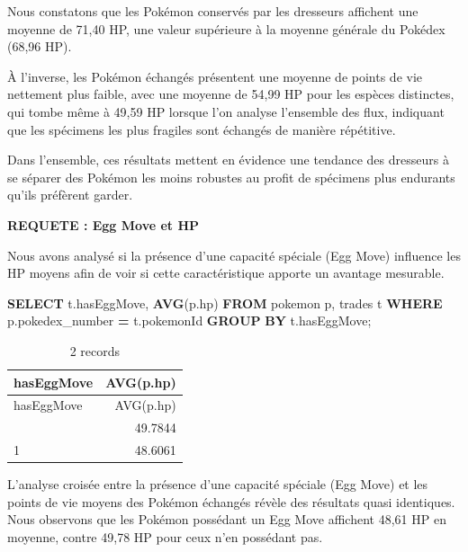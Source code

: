 \documentclass[mstat,12pt]{unswthesis}
\newenvironment{Shaded}{\begin{snugshade}}{\end{snugshade}}
\newcommand{\FunctionTok}[1]{\textcolor[rgb]{0.13,0.29,0.53}{\textbf{#1}}}
\newcommand{\KeywordTok}[1]{\textcolor[rgb]{0.13,0.29,0.53}{\textbf{#1}}}
\newcommand{\NormalTok}[1]{#1}
\newcommand{\OperatorTok}[1]{\textcolor[rgb]{0.81,0.36,0.00}{\textbf{#1}}}
\begin{document}
Nous constatons que les Pokémon conservés par les dresseurs affichent
une moyenne de 71,40 HP, une valeur supérieure à la moyenne générale du
Pokédex (68,96 HP).

À l'inverse, les Pokémon échangés présentent une moyenne de points de
vie nettement plus faible, avec une moyenne de 54,99 HP pour les espèces
distinctes, qui tombe même à 49,59 HP lorsque l'on analyse l'ensemble
des flux, indiquant que les spécimens les plus fragiles sont échangés de
manière répétitive.

Dans l'ensemble, ces résultats mettent en évidence une tendance des
dresseurs à se séparer des Pokémon les moins robustes au profit de
spécimens plus endurants qu'ils préfèrent garder.

\bigskip

\textbf{REQUETE : Egg Move et HP}

\bigskip

Nous avons analysé si la présence d'une capacité spéciale (Egg Move)
influence les HP moyens afin de voir si cette caractéristique apporte un
avantage mesurable.

\begin{Shaded}
\begin{Highlighting}[]
\KeywordTok{SELECT}\NormalTok{ t.hasEggMove, }\FunctionTok{AVG}\NormalTok{(p.hp) }
\KeywordTok{FROM}\NormalTok{ pokemon p, trades t }
\KeywordTok{WHERE}\NormalTok{ p.pokedex\_number }\OperatorTok{=}\NormalTok{ t.pokemonId }
\KeywordTok{GROUP} \KeywordTok{BY}\NormalTok{ t.hasEggMove;}
\end{Highlighting}
\end{Shaded}

\begin{longtable}[]{@{}lr@{}}
\caption{2 records}\tabularnewline
\toprule\noalign{}
hasEggMove & AVG(p.hp) \\
\midrule\noalign{}
\endfirsthead
\toprule\noalign{}
hasEggMove & AVG(p.hp) \\
\midrule\noalign{}
\endhead
\bottomrule\noalign{}
\endlastfoot
0 & 49.7844 \\
1 & 48.6061 \\
\end{longtable}

L'analyse croisée entre la présence d'une capacité spéciale (Egg Move)
et les points de vie moyens des Pokémon échangés révèle des résultats
quasi identiques. Nous observons que les Pokémon possédant un Egg Move
affichent 48,61 HP en moyenne, contre 49,78 HP pour ceux n'en possédant
pas.
\end{document}
